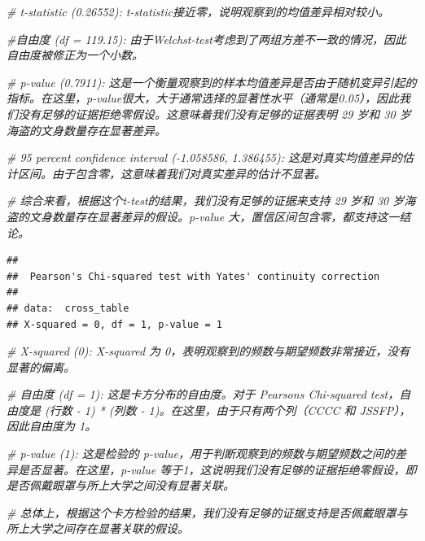 \documentclass[
  hyperref,]{ctexart}
\newenvironment{Shaded}{\begin{snugshade}}{\end{snugshade}}
\newcommand{\CommentTok}[1]{\textcolor[rgb]{0.56,0.35,0.01}{\textit{#1}}}
\newcommand{\FunctionTok}[1]{\textcolor[rgb]{0.13,0.29,0.53}{\textbf{#1}}}
\newcommand{\NormalTok}[1]{#1}
\newcommand{\OtherTok}[1]{\textcolor[rgb]{0.56,0.35,0.01}{#1}}
\newcommand{\SpecialCharTok}[1]{\textcolor[rgb]{0.81,0.36,0.00}{\textbf{#1}}}
\begin{document}
\begin{Shaded}
\begin{Highlighting}[]
\CommentTok{\# t{-}statistic (0.26552): t{-}statistic接近零，说明观察到的均值差异相对较小。}

\CommentTok{\#自由度 (df = 119.15): 由于Welch\textquotesingle{}st{-}test考虑到了两组方差不一致的情况，因此自由度被修正为一个小数。}

\CommentTok{\# p{-}value (0.7911): 这是一个衡量观察到的样本均值差异是否由于随机变异引起的指标。在这里，p{-}value很大，大于通常选择的显著性水平（通常是0.05），因此我们没有足够的证据拒绝零假设。这意味着我们没有足够的证据表明 29 岁和 30 岁海盗的文身数量存在显著差异。}

\CommentTok{\# 95 percent confidence interval ({-}1.058586, 1.386455): 这是对真实均值差异的估计区间。由于包含零，这意味着我们对真实差异的估计不显著。}

\CommentTok{\# 综合来看，根据这个t{-}test的结果，我们没有足够的证据来支持 29 岁和 30 岁海盗的文身数量存在显著差异的假设。p{-}value 大，置信区间包含零，都支持这一结论。}
\end{Highlighting}
\end{Shaded}

\begin{Shaded}
\end{Shaded}

\begin{verbatim}
## 
##  Pearson's Chi-squared test with Yates' continuity correction
## 
## data:  cross_table
## X-squared = 0, df = 1, p-value = 1
\end{verbatim}

\begin{Shaded}
\begin{Highlighting}[]
\CommentTok{\# X{-}squared (0): X{-}squared 为 0，表明观察到的频数与期望频数非常接近，没有显著的偏离。}

\CommentTok{\# 自由度 (df = 1): 这是卡方分布的自由度。对于 Pearson\textquotesingle{}s Chi{-}squared test，自由度是 (行数 {-} 1) * (列数 {-} 1)。在这里，由于只有两个列（\textquotesingle{}CCCC\textquotesingle{} 和 \textquotesingle{}JSSFP\textquotesingle{}），因此自由度为 1。}

\CommentTok{\# p{-}value (1): 这是检验的 p{-}value，用于判断观察到的频数与期望频数之间的差异是否显著。在这里，p{-}value 等于1，这说明我们没有足够的证据拒绝零假设，即是否佩戴眼罩与所上大学之间没有显著关联。}

\CommentTok{\# 总体上，根据这个卡方检验的结果，我们没有足够的证据支持是否佩戴眼罩与所上大学之间存在显著关联的假设。}
\end{Highlighting}
\end{Shaded}
\end{document}
